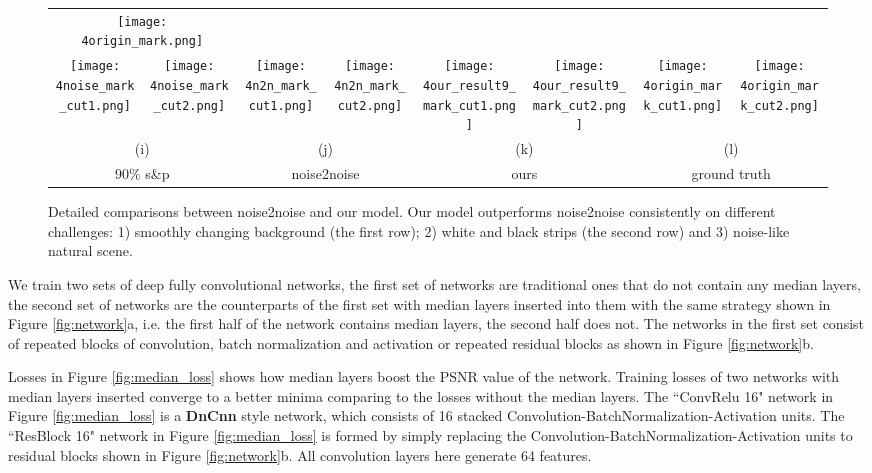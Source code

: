 \documentclass[journal]{IEEEtran}
\begin{document}
\begin{figure*}
\begin{tabular}{cccccccc}
  \multicolumn{2}{c}{\texttt{[image: 4origin\_mark.png]}} \\
  \texttt{[image: 4noise\_mark\_cut1.png]} &
  \texttt{[image: 4noise\_mark\_cut2.png]} &
  \texttt{[image: 4n2n\_mark\_cut1.png]} &
  \texttt{[image: 4n2n\_mark\_cut2.png]} &
  \texttt{[image: 4our\_result9\_mark\_cut1.png]} &
  \texttt{[image: 4our\_result9\_mark\_cut2.png]} &
  \texttt{[image: 4origin\_mark\_cut1.png]} &
  \texttt{[image: 4origin\_mark\_cut2.png]} \\
  \multicolumn{2}{c}{(i)} &
  \multicolumn{2}{c}{(j)} &
  \multicolumn{2}{c}{(k)} &
  \multicolumn{2}{c}{(l)} \\
  \multicolumn{2}{c}{\small 90\% s\&p } &
  \multicolumn{2}{c}{\small noise2noise} &
  \multicolumn{2}{c}{\small ours} &
  \multicolumn{2}{c}{\small ground truth} \\
  \end{tabular}
  \caption{Detailed comparisons between noise2noise and our model. Our model outperforms noise2noise consistently on different challenges: 1) smoothly changing background (the first row); 2) white and black strips (the second row) and 3) noise-like natural scene.} \label{fig:detail}
\end{figure*}

We train two sets of deep fully convolutional networks, the first set of networks are traditional ones that do not contain any median layers, the second set of networks are the counterparts of the first set with median layers inserted into them with the same strategy shown in Figure \ref{fig:network}a, i.e. the first half of the network contains median layers, the second half does not. The networks in the first set consist of repeated blocks of convolution, batch normalization and activation or repeated residual blocks as shown in Figure \ref{fig:network}b.

Losses in Figure \ref{fig:median_loss} shows how median layers boost the PSNR value of the network. Training losses of two networks with median layers inserted converge to a better minima comparing to the losses without the median layers. The ``ConvRelu 16" network in Figure \ref{fig:median_loss} is a \textbf{DnCnn} \cite{zhang2017beyond} style network, which consists of 16 stacked Convolution-BatchNormalization-Activation units. The ``ResBlock 16" network in Figure \ref{fig:median_loss} is formed by simply replacing the Convolution-BatchNormalization-Activation units to residual blocks shown in Figure \ref{fig:network}b. All convolution layers here generate 64 features.
\end{document}
